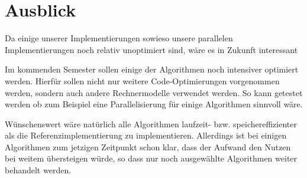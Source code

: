 \section{Ausblick}

Da einige unserer Implementierungen sowieso unsere parallelen Implementierungen noch relativ unoptimiert sind, wäre es in Zukunft interessant

Im  kommenden Semester sollen einige der Algorithmen noch intensiver optimiert werden.
Hierfür sollen nicht nur weitere Code-Optimierungen vorgenommen werden, sondern auch andere Rechnermodelle verwendet werden.
So kann getestet werden ob zum Beispiel eine Parallelisierung für einige Algorithmen sinnvoll wäre.

Wünschenswert wäre natürlich alle Algorithmen laufzeit- bzw. speichereffizienter als die Referenzimplementierung zu implementieren.
Allerdings ist bei einigen Algorithmen zum jetzigen Zeitpunkt schon klar,
dass der Aufwand den Nutzen bei weitem übersteigen würde, so dass nur noch ausgewählte Algorithmen weiter behandelt werden.